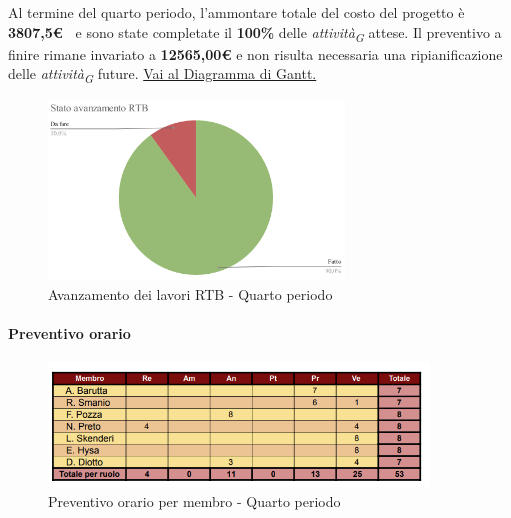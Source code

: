 \vspace{1cm}

Al termine del quarto periodo, l'ammontare totale del costo del progetto è \textbf{ 3807,5\euro\ } e sono state completate il \textbf{100\%} delle \textit{attività}\textsubscript{\textit{G}} attese.
Il preventivo a finire rimane invariato a \textbf{12565,00€} e non risulta necessaria una ripianificazione delle \textit{attività}\textsubscript{\textit{G}} future.
\href{https://github.com/orgs/ByteOps-swe/projects/3/views/1?sortedBy%5Bdirection%5D=asc&sortedBy%5BcolumnId%5D=64182560}{Vai al Diagramma di Gantt.}

\pagebreak

\begin{figure}[H]
    \centering
    \begin{minipage}[b]{0.70\textwidth}
        \centering
        \includegraphics[width=0.7\textwidth]{../Images/torta4.png}
        \caption{Avanzamento dei lavori RTB - Quarto periodo}
        \label{fig:Avanzamento_RTB_4}
    \end{minipage}
\end{figure}

\paragraph{Preventivo orario} 

\begin{figure}[H]
    \centering
    \includegraphics[width=0.9\textwidth]{../Images/tabPrev4.png}
    \caption{Preventivo orario per membro - Quarto periodo}
    \label{fig:Preventivo_orario_4}
\end{figure}

